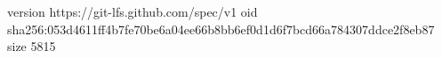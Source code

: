 version https://git-lfs.github.com/spec/v1
oid sha256:053d4611ff4b7fe70be6a04ee66b8bb6ef0d1d6f7bcd66a784307ddce2f8eb87
size 5815
